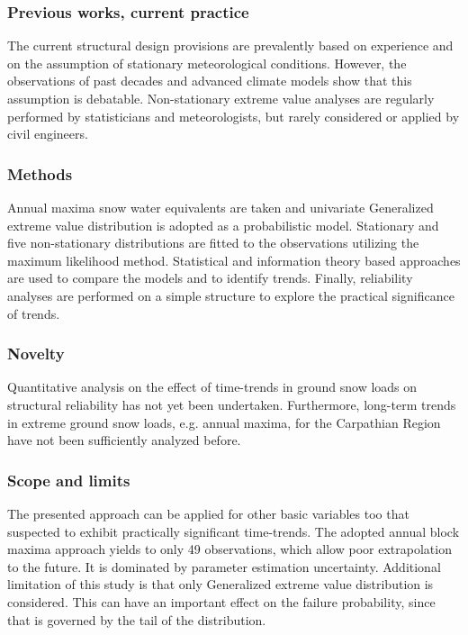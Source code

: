 \subsubsection{Previous works, current practice}
The current structural design provisions are prevalently based on experience and on the assumption of stationary meteorological conditions. However, the observations of past decades and advanced climate models show that this assumption is debatable. Non-stationary extreme value analyses are regularly performed by statisticians and meteorologists, but rarely considered or applied by civil engineers.

\subsubsection{Methods}
Annual maxima snow water equivalents are taken and univariate Generalized extreme value distribution is adopted as a probabilistic model. Stationary and five non-stationary distributions are fitted to the observations utilizing the maximum likelihood method. Statistical and information theory based approaches are used to compare the models and to identify trends. Finally, reliability analyses are performed on a simple structure to explore the practical significance of trends.

\subsubsection{Novelty}
Quantitative analysis on the effect of time-trends in ground snow loads on structural reliability has not yet been undertaken. Furthermore, long-term trends in extreme ground snow loads, e.g. annual maxima, for the Carpathian Region have not been sufficiently analyzed before.

\subsubsection{Scope and limits}
The presented approach can be applied for other basic variables too that suspected to exhibit practically significant time-trends. The adopted annual block maxima approach yields to only 49 observations, which allow poor extrapolation to the future. It is dominated by parameter estimation uncertainty. Additional limitation of this study is that only Generalized extreme value distribution is considered. This can have an important effect on the failure probability, since that is governed by the tail of the distribution.
 
